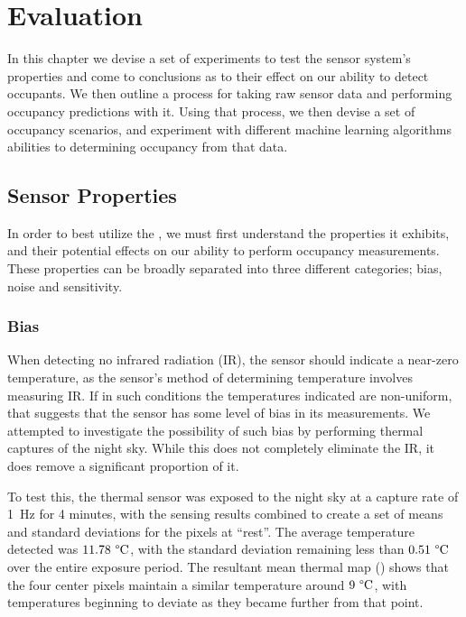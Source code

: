 \documentclass[../thesis/thesis.tex]{subfiles}
\begin{document}
 \chapter{Evaluation}
 \label{chap:evaluation}

In this chapter we devise a set of experiments to test the sensor system's properties and come to conclusions as to their effect on our ability to detect occupants. We then outline a process for taking raw sensor data and performing occupancy predictions with it. Using that process, we then devise a set of occupancy scenarios, and experiment with different machine learning algorithms abilities to determining occupancy from that data.

\section{Sensor Properties}

In order to best utilize the \mlx, we must first understand the properties it exhibits, and their potential effects on our ability to perform occupancy measurements. These properties can be broadly separated into three different categories; bias, noise and sensitivity.

\subsection{Bias}
When detecting no infrared radiation (IR), the sensor should indicate a near-zero temperature, as the sensor's method of determining temperature involves measuring IR. If in such conditions the temperatures indicated are non-uniform, that suggests that the sensor has some level of bias in its measurements. We attempted to investigate the possibility of such bias by performing thermal captures of the night sky. While this does not completely eliminate the IR, it does remove a significant proportion of it.

To test this, the thermal sensor was exposed to the night sky at a capture rate of 1~Hz for 4 minutes, with the sensing results combined to create a set of means and standard deviations for the pixels at ``rest''. The average temperature detected was $11.78~\degree\textrm{C}$, with the standard deviation remaining less than $0.51~\degree\textrm{C}$ over the entire exposure period. The resultant mean thermal map () shows that the four center pixels maintain a similar temperature around $9~\degree\textrm{C}$, with temperatures beginning to deviate as they became further from that point.
\end{document}
